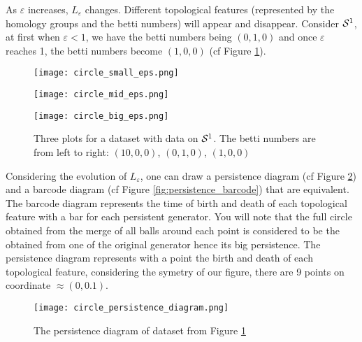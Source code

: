 \documentclass[12pt, a4paper]{article}
\begin{document}
As $\varepsilon$ increases, $L_\varepsilon$ changes. Different topological features (represented by the homology groups and the betti numbers) will appear and disappear. Consider $\S^1$, at first when $\varepsilon < 1$, we have the betti numbers being $(0,1,0)$ and once $\varepsilon$ reaches 1, the betti numbers become $(1,0,0)$ (cf Figure \ref{fig:betti_s1}). 

\begin{figure}[h]
  \begin{minipage}[c]{.32\linewidth}
             \centering
            \texttt{[image: circle\_small\_eps.png]}
         \end{minipage}
         \hfill%
         \begin{minipage}[c]{.32\linewidth}
             \centering
            \texttt{[image: circle\_mid\_eps.png]}
        \end{minipage}
         \hfill%
         \begin{minipage}[c]{.32\linewidth}
             \centering
            \texttt{[image: circle\_big\_eps.png]}
        \end{minipage}
        \caption{Three plots for a dataset with data on $\S^1$. The betti numbers are from left to right: $(10,0,0)$, $(0,1,0)$, $(1,0,0)$}
  \label{fig:betti_s1}
\end{figure}

Considering the evolution of $L_\varepsilon$, one can draw a persistence diagram (cf Figure \ref{fig:persistence_diagram}) and a barcode diagram (cf Figure \ref{fig:persistence_barcode}) that are equivalent. The barcode diagram represents the time of birth and death of each topological feature with a bar for each persistent generator. You will note that the full circle obtained from the merge of all balls around each point is considered to be the obtained from one of the original generator hence its big persistence. The persistence diagram represents with a point the birth and death of each topological feature, considering the symetry of our figure, there are 9 points on coordinate $\approx(0,0.1)$.\\ 

\begin{figure}[p]
             \centering
            \texttt{[image: circle\_persistence\_diagram.png]}
        \caption{The persistence diagram of dataset from Figure \ref{fig:betti_s1}}
        \label{fig:persistence_diagram}
\end{figure}
\end{document}
